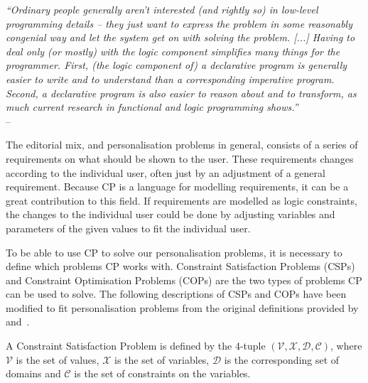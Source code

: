 \begin{flushright}{\slshape
	``Ordinary people generally aren't interested (and rightly so) in low-level programming details -- they just want to express the problem in some reasonably congenial way and let the system get on with solving the problem. [...] Having to deal only (or mostly) with the logic component simplifies many things for the programmer. First, (the logic component of) a declarative program is generally easier to write and to understand than a corresponding imperative program. Second, a declarative program is also easier to reason about and to transform, as much current research in functional and logic programming shows.''} \\ \medskip
-- \cite{LloydDeclarative}
\end{flushright}

The editorial mix, and personalisation problems in general, consists of a series of requirements on what should be shown to the user. These requirements changes according to the individual user, often just by an adjustment of a general requirement. Because CP is a language for modelling requirements, it can be a great contribution to this field. If requirements are modelled as logic constraints, the changes to the individual user could be done by adjusting variables and parameters of the given values to fit the individual user.

To be able to use CP to solve our personalisation problems, it is necessary to define which problems CP works with. Constraint Satisfaction Problems (CSPs) and Constraint Optimisation Problems (COPs) are the two types of problems CP can be used to solve. The following descriptions of CSPs and COPs have been modified to fit personalisation problems from the original definitions provided by \cite{AIRussell} and~\cite{CPApt}.

A Constraint Satisfaction Problem is defined by the 4-tuple $(\mathcal{V}, \mathcal{X}, \mathcal{D}, \mathcal{C})$, where $\mathcal{V}$ is the set of values, $\mathcal{X}$ is the set of variables, $\mathcal{D}$ is the corresponding set of domains and $\mathcal{C}$ is the set of constraints on the variables.

